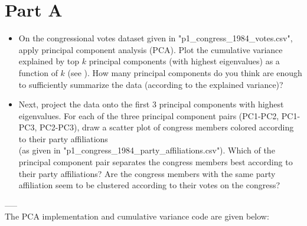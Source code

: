 \section{Part A}
	
 \begin{itemize}
 \item
 On the congressional votes dataset given in "p1\_congress\_1984\_votes.csv", apply principal component analysis (PCA). Plot the cumulative variance explained by top $k$ principal components (with highest eigenvalues) as a function of $k$ (see ). How many principal components do you think are enough to sufficiently summarize the data (according to the explained variance)? 
 
 \item
 Next, project the data onto the first 3 principal components with highest eigenvalues. For each of the three principal component pairs (PC1-PC2, PC1-PC3, PC2-PC3), draw a scatter plot of congress members colored according to their party affiliations\\ (as given in "p1\_congress\_1984\_party\_affiliations.csv"). Which of the principal component pair separates the congress members best according to their party affiliations? Are the congress members with the same party affiliation seem to be clustered according to their votes on the congress?
\end{itemize}
 
-----\\

The PCA implementation and cumulative variance code are given below:

